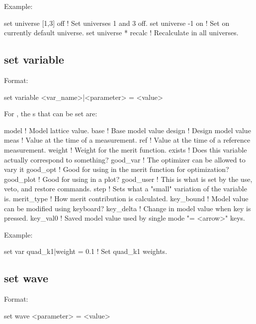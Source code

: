 {{{{{{{{Example:
\begin{example}
  set universe [1,3] off ! Set universes 1 and 3 off.
  set universe -1 on     ! Set on currently default universe.
  set universe * recalc  ! Recalculate in all universes.
\end{example}


\subsection{set variable}
\label{s:set.variable}

Format:
\begin{example}
  set variable <var_name>|<parameter> = <value>
\end{example}

For , the s that can be set are:
\begin{example}
  model       ! Model lattice value.
  base        ! Base model value
  design      ! Design model value
  meas        ! Value at the time of a measurement.
  ref         ! Value at the time of a reference measurement.
  weight      ! Weight for the merit function.
  exists      ! Does this variable actually correspond to something?
  good_var    ! The optimizer can be allowed to vary it
  good_opt    ! Good for using in the merit function for optimization?
  good_plot   ! Good for using in a plot?
  good_user   ! This is what is set by the use, veto, and restore commands.
  step        ! Sets what a "small" variation of the variable is.
  merit_type  ! How merit contribution is calculated.
  key_bound   ! Model value can be modified using keyboard?
  key_delta   ! Change in model value when key is pressed.
  key_val0    ! Saved model value used by single mode "= <arrow>" keys.
\end{example}

Example:
\begin{example}
  set var quad_k1|weight = 0.1         ! Set quad_k1 weights. 
\end{example}


\subsection{set wave}
\label{s:set.wave}

Format:
\begin{example}
  set wave <parameter> = <value>
\end{example}

}}}}}}}}
